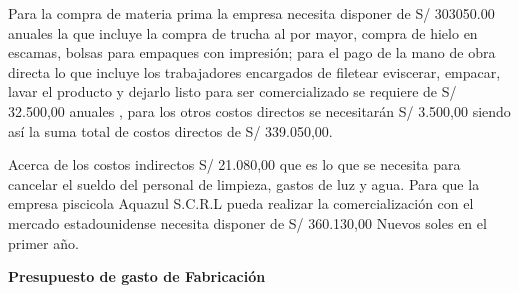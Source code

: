 \documentclass[
  stu,
  floatsintext,
  longtable,
  a4paper,
  nolmodern,
  notxfonts,
  notimes,
  colorlinks=true,linkcolor=blue,citecolor=blue,urlcolor=blue]{apa7}
\begin{document}
Para la compra de materia prima la empresa necesita disponer de S/
303050.00 anuales la que incluye la compra de trucha al por mayor,
compra de hielo en escamas, bolsas para empaques con impresión; para el
pago de la mano de obra directa lo que incluye los trabajadores
encargados de filetear eviscerar, empacar, lavar el producto y dejarlo
listo para ser comercializado se requiere de S/ 32.500,00 anuales , para
los otros costos directos se necesitarán S/ 3.500,00 siendo así la suma
total de costos directos de S/ 339.050,00.

Acerca de los costos indirectos S/ 21.080,00 que es lo que se necesita
para cancelar el sueldo del personal de limpieza, gastos de luz y agua.
Para que la empresa piscicola Aquazul S.C.R.L pueda realizar la
comercialización con el mercado estadounidense necesita disponer de S/
360.130,00 Nuevos soles en el primer año.

\textbf{Presupuesto de gasto de Fabricación}
\end{document}
